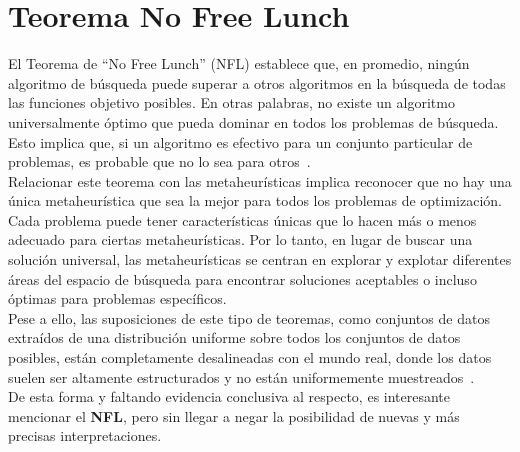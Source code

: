 \section{Teorema No Free Lunch}
El Teorema de ``No Free Lunch'' (NFL) establece que, en promedio, ningún algoritmo de búsqueda puede superar a otros algoritmos en la búsqueda de todas las funciones objetivo posibles. En otras palabras, no existe un algoritmo universalmente óptimo que pueda dominar en todos los problemas de búsqueda. Esto implica que, si un algoritmo es efectivo para un conjunto particular de problemas, es probable que no lo sea para otros~\cite{585893}.\\[6pt]
Relacionar este teorema con las metaheurísticas implica reconocer que no hay una única metaheurística que sea la mejor para todos los problemas de optimización. Cada problema puede tener características únicas que lo hacen más o menos adecuado para ciertas metaheurísticas. Por lo tanto, en lugar de buscar una solución universal, las metaheurísticas se centran en explorar y explotar diferentes áreas del espacio de búsqueda para encontrar soluciones aceptables o incluso óptimas para problemas específicos.\\[6pt]
Pese a ello, las suposiciones de este tipo de teoremas, como conjuntos de datos extraídos de una distribución uniforme sobre todos los conjuntos de datos posibles, están completamente desalineadas con el mundo real, donde los datos suelen ser altamente estructurados y no están uniformemente muestreados~\cite{goldblum2023free}.\\[6pt]
De esta forma y faltando evidencia conclusiva al respecto, es interesante mencionar el \textbf{NFL}, pero sin llegar a negar la posibilidad de nuevas y más precisas interpretaciones.

